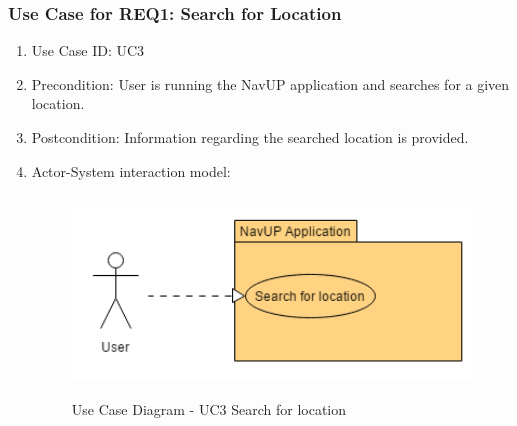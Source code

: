 		
		\newpage
		\subsubsection{Use Case for REQ1: Search for Location}
			\begin{enumerate}
			\renewcommand{\labelenumi}{{\textbf{\arabic{enumi}.}}}
			\item Use Case ID: UC3
			\item Precondition: User is running the NavUP application and searches for a given location.
			\item Postcondition: Information regarding  the searched location is provided.
			\item Actor-System interaction model:
				\graphicspath{ {./Diagrams/User/} }
				\begin{figure}[h]
				\caption{Use Case Diagram -  UC3  Search for location}
				\includegraphics[height = 200px]{SearchForLocation.png}
				\end{figure}
			\end{enumerate}

